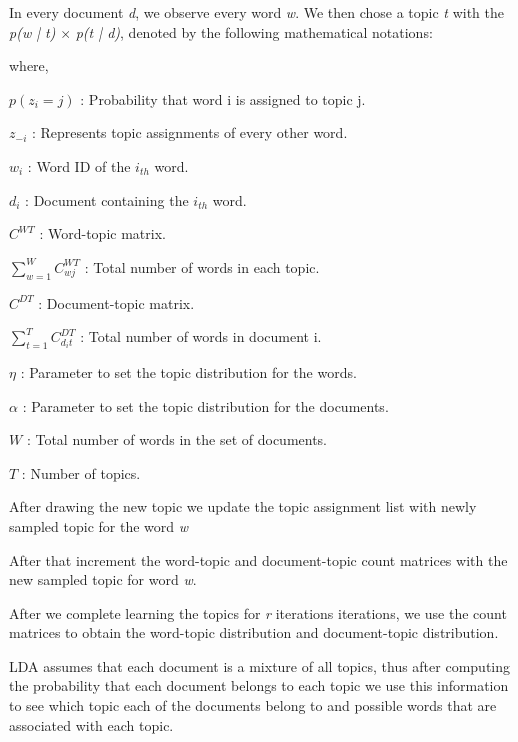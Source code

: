 \documentclass{article}
\begin{document}
	In every document \textit{d}, we observe every word \textit{w}.  We then chose a topic \textit{t} with the \textit{p(w | t)} $		\times$ \textit{p(t | d)}, denoted by the following mathematical notations:
	
\twocolumn[
\vskip 0.3 in

$$ p( z_i = j \text{ }| \text{ } z_{-i}, w_i, d_i ) = \frac{ C^{WT}{w_ij} + \eta }{ \sum^W{ w = 1 }C^{WT}{wj} + W\eta }\times 			\frac{ C^{DT}{d_ij} + \alpha }{ \sum^T_{ t = 1 }C^{DT}_{d_it} + T\alpha } $$


\vskip 0.3 in

]
where, 

$p(z_i = j)$ : Probability that word i is assigned to topic j.

$z_{-i}$ : Represents topic assignments of every other word.

$w_i$ : Word ID of the $i_{th}$ word.

$d_i$ : Document containing the $i_{th}$ word.

$C^{WT}$ : Word-topic matrix.

$\sum^W_{ w = 1 }C^{WT}_{wj}$ : Total number of words in each topic.

$C^{DT}$ : Document-topic matrix.

$\sum^T_{ t = 1 }C^{DT}_{d_it}$ : Total number of words in document i.

$\eta$ : Parameter to set the topic distribution for the words.

$\alpha$ : Parameter to set the topic distribution for the documents.

$W$ : Total number of words in the set of documents.

$T$ : Number of topics.


After drawing the new topic we update the topic assignment list with newly sampled topic for the word \textit{w}

After that increment the word-topic and document-topic count matrices with the new sampled topic for word \textit{w}.

After we complete learning the topics for \textit{r} iterations iterations, we use the count matrices to obtain the word-topic distribution and document-topic distribution.

LDA assumes that each document is a mixture of all topics, thus after computing the probability that each document belongs to each topic we use this information to see which topic each of the documents belong to and possible words that are associated with each topic.
\end{document}
